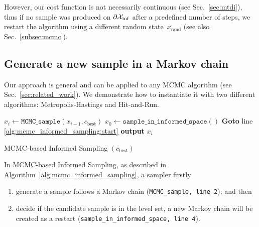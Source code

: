 \documentclass[letterpaper, 10 pt, conference]{ieeeconf}  %
\begin{document}
However, our cost function is not necessarily continuous (see Sec.~\ref{sec:mtdi}), thus if no sample was produced on $\partial \mathcal{X}_{\rm {inf}}$ after a predefined number of steps, we restart the algorithm using a different random state~$x_\text{rand}$
(see also Sec.~\ref{subsec:mcmc}).


\subsection{Generate a new sample in a Markov chain}
\label{mcmc}

Our approach is general and can be applied to any MCMC algorithm (see Sec.~\ref{sec:related_work}).
We demonstrate how to instantiate it with two different algorithms: 
Metropolis-Hastings and Hit-and-Run.

\begin{algorithm}[t]
	\begin{algorithmic}[1]
		\LOOP
		\STATE $x_{i} \leftarrow \texttt{MCMC\_sample} (x_{i-1}, c_{\text{best}})$ \label{alg:mcmc_informed_sampling:start}
			\STATE $x_{0} \leftarrow \texttt{sample\_in\_informed\_space}( )$
			\STATE \textbf{Goto} line \ref{alg:mcmc_informed_sampling:start} 
		\ENDIF
		\STATE \textbf{output} $x_{i}$
		\ENDLOOP 
	\end{algorithmic}
	\caption{MCMC-based Informed Sampling $(c_{\text{best}})$}
	\label{alg:mcmc_informed_sampling}	
\end{algorithm}


In MCMC-based Informed Sampling, as described in Algorithm~\ref{alg:mcmc_informed_sampling}, 
a sampler firstly 
\begin{enumerate}
\item generate a sample follows a Markov chain 
(\texttt{MCMC\_sample, line 2});
and then
\item decide if the candidate sample is in the level set, a new Markov chain will be created as a restart
(\texttt{sample\_in\_informed\_space, line 4}).
\end{enumerate}
\end{document}
